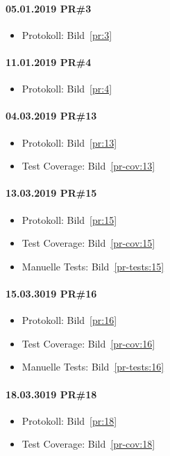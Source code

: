 \documentclass[accentcolor=tud0b,12pt,paper=a4]{tudreport}
\begin{document}
\paragraph{05.01.2019 PR\#3}
\begin{itemize}
\item Protokoll: Bild~\ref{pr:3}
\end{itemize}

\paragraph{11.01.2019 PR\#4}
\begin{itemize}
\item Protokoll: Bild~\ref{pr:4}
\end{itemize}

\paragraph{04.03.2019 PR\#13}
\begin{itemize}
\item Protokoll: Bild~\ref{pr:13}
\item Test Coverage: Bild~\ref{pr-cov:13}
\end{itemize}

\paragraph{13.03.2019 PR\#15}
\begin{itemize}
\item Protokoll: Bild~\ref{pr:15}
\item Test Coverage: Bild~\ref{pr-cov:15}
\item Manuelle Tests: Bild~\ref{pr-tests:15}
\end{itemize}

\paragraph{15.03.3019 PR\#16}
\begin{itemize}
\item Protokoll: Bild~\ref{pr:16}
\item Test Coverage: Bild~\ref{pr-cov:16}
\item Manuelle Tests: Bild~\ref{pr-tests:16}
\end{itemize}

\paragraph{18.03.3019 PR\#18}
\begin{itemize}
\item Protokoll: Bild~\ref{pr:18}
\item Test Coverage: Bild~\ref{pr-cov:18}
\end{itemize}
\end{document}
